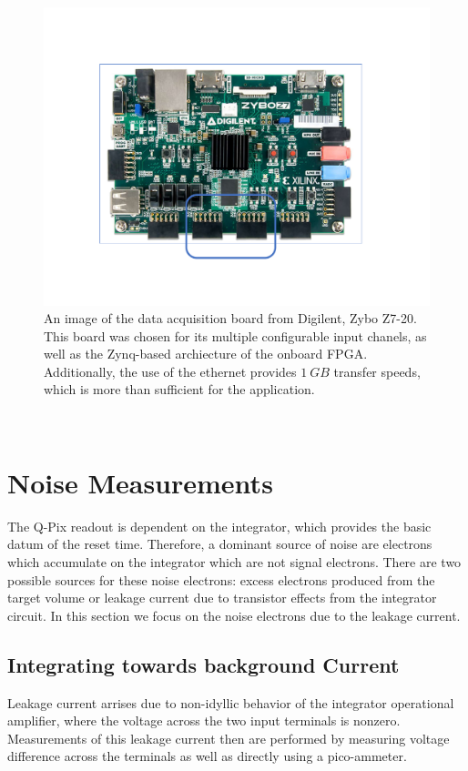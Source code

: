 \begin{figure}[]
\centering
\includegraphics[width=\textwidth]{images/SAQ_zybo_daq.pdf}
\caption{An image of the data acquisition board from Digilent, Zybo Z7-20. This board was chosen for its multiple configurable input chanels, as well as the Zynq-based archiecture of the onboard FPGA. Additionally, the use of the ethernet provides $1~\unit{GB}$ transfer speeds, which is more than sufficient for the application.}
\end{figure}~\label{fig:saq_zybo}


\section{Noise Measurements}

The Q-Pix readout is dependent on the integrator, which provides the basic datum of the reset time.
Therefore, a dominant source of noise are electrons which accumulate on the integrator which are not signal electrons.
There are two possible sources for these noise electrons: excess electrons produced from the target volume or leakage current due to transistor effects from the integrator circuit.
In this section we focus on the noise electrons due to the leakage current.

\subsection{Integrating towards background Current}

Leakage current arrises due to non-idyllic behavior of the integrator operational amplifier, where the voltage across the two input terminals is nonzero.
Measurements of this leakage current then are performed by measuring voltage difference across the terminals as well as directly using a pico-ammeter.

